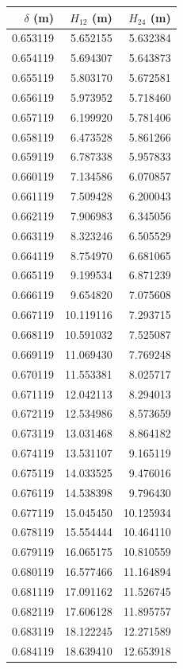 \begin{tabular}{rrr}
\toprule
$\delta$ (m) & $H_{12}$ (m) & $H_{24}$ (m) \\
\midrule
0.653119 & 5.652155 & 5.632384 \\
0.654119 & 5.694307 & 5.643873 \\
0.655119 & 5.803170 & 5.672581 \\
0.656119 & 5.973952 & 5.718460 \\
0.657119 & 6.199920 & 5.781406 \\
0.658119 & 6.473528 & 5.861266 \\
0.659119 & 6.787338 & 5.957833 \\
0.660119 & 7.134586 & 6.070857 \\
0.661119 & 7.509428 & 6.200043 \\
0.662119 & 7.906983 & 6.345056 \\
0.663119 & 8.323246 & 6.505529 \\
0.664119 & 8.754970 & 6.681065 \\
0.665119 & 9.199534 & 6.871239 \\
0.666119 & 9.654820 & 7.075608 \\
0.667119 & 10.119116 & 7.293715 \\
0.668119 & 10.591032 & 7.525087 \\
0.669119 & 11.069430 & 7.769248 \\
0.670119 & 11.553381 & 8.025717 \\
0.671119 & 12.042113 & 8.294013 \\
0.672119 & 12.534986 & 8.573659 \\
0.673119 & 13.031468 & 8.864182 \\
0.674119 & 13.531107 & 9.165119 \\
0.675119 & 14.033525 & 9.476016 \\
0.676119 & 14.538398 & 9.796430 \\
0.677119 & 15.045450 & 10.125934 \\
0.678119 & 15.554444 & 10.464110 \\
0.679119 & 16.065175 & 10.810559 \\
0.680119 & 16.577466 & 11.164894 \\
0.681119 & 17.091162 & 11.526745 \\
0.682119 & 17.606128 & 11.895757 \\
0.683119 & 18.122245 & 12.271589 \\
0.684119 & 18.639410 & 12.653918 \\

\end{tabular}
